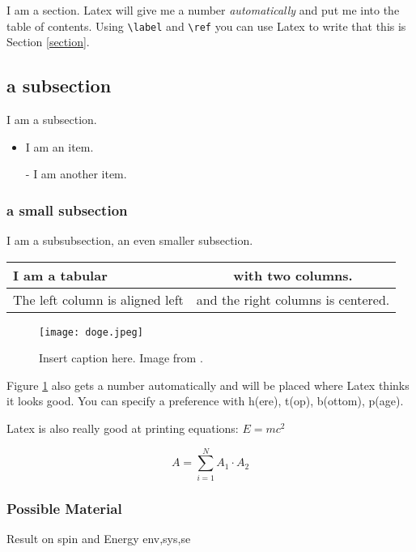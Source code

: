 \documentclass[twoside,a4paper,article]{combine}
\begin{document}
I am a section. Latex will give me a number \emph{automatically} and put me into the table of contents.
Using \verb+\label+ and \verb+\ref+ you can use Latex to write that this is Section \ref{section}.



\subsection{a subsection}
I am a subsection.

\begin{itemize}
	\item I am an item.
	\item [-] I am another item.
\end{itemize}

\subsubsection{a small subsection}
I am a subsubsection, an even smaller subsection.

\begin{tabular}{|l|c|}
\hline
I am a tabular & with two columns. \\
\hline
The left column is aligned left & and the right columns is centered. \\
\hline
\end{tabular}


\begin{figure}[h]
\centering
\texttt{[image: doge.jpeg]}
\caption{Insert caption here. Image from \cite{lenna}. }
\label{example_figure}
\end{figure}
Figure \ref{example_figure} also gets a number automatically and will be placed where Latex thinks it looks good. You can specify a preference with h(ere), t(op), b(ottom), p(age).



Latex is also really good at printing equations: $E=mc^2$

\begin{equation}
A = \sum_{i=1}^N A_1 \cdot A_2
\end{equation}

\subsubsection{Possible Material}
Result on spin and Energy env,sys,se
\end{document}
